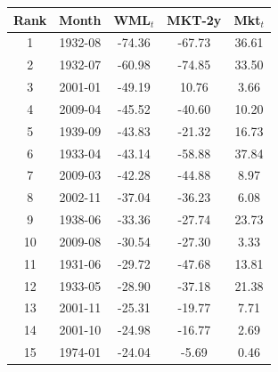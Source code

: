 \begin{tabular}{ccccc}
\toprule
Rank & Month & WML$_t$ & MKT-2y & Mkt$_t$ \\
\midrule
1 & 1932-08 & -74.36 & -67.73 & 36.61 \\
2 & 1932-07 & -60.98 & -74.85 & 33.50 \\
3 & 2001-01 & -49.19 & 10.76 & 3.66 \\
4 & 2009-04 & -45.52 & -40.60 & 10.20 \\
5 & 1939-09 & -43.83 & -21.32 & 16.73 \\
6 & 1933-04 & -43.14 & -58.88 & 37.84 \\
7 & 2009-03 & -42.28 & -44.88 & 8.97 \\
8 & 2002-11 & -37.04 & -36.23 & 6.08 \\
9 & 1938-06 & -33.36 & -27.74 & 23.73 \\
10 & 2009-08 & -30.54 & -27.30 & 3.33 \\
11 & 1931-06 & -29.72 & -47.68 & 13.81 \\
12 & 1933-05 & -28.90 & -37.18 & 21.38 \\
13 & 2001-11 & -25.31 & -19.77 & 7.71 \\
14 & 2001-10 & -24.98 & -16.77 & 2.69 \\
15 & 1974-01 & -24.04 & -5.69 & 0.46 \\
\bottomrule
\end{tabular}

